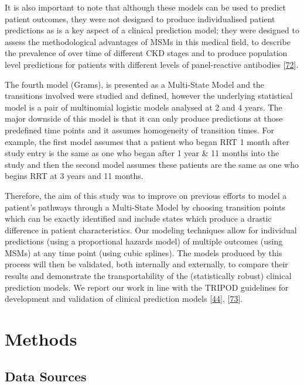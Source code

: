 \documentclass[12pt,PhD,twoside,openright]{muthesis}
\begin{document}
It is also important to note that although these models can be used to predict patient outcomes, they were not designed to produce individualised patient predictions as is a key aspect of a clinical prediction model; they were designed to assess the methodological advantages of MSMs in this medical field, to describe the prevalence of over time of different CKD stages and to produce population level predictions for patients with different levels of panel-reactive antibodies {[}\protect\hyperlink{ref-royston_prognosis_2009}{72}{]}.

The fourth model (Grams), is presented as a Multi-State Model and the transitions involved were studied and defined, however the underlying statistical model is a pair of multinomial logistic models analysed at 2 and 4 years. The major downside of this model is that it can only produce predictions at those predefined time points and it assumes homogeneity of transition times. For example, the first model assumes that a patient who began RRT 1 month after study entry is the same as one who began after 1 year \& 11 months into the study and then the second model assumes these patients are the same as one who begins RRT at 3 years and 11 months.

Therefore, the aim of this study was to improve on previous efforts to model a patient's pathways through a Multi-State Model by choosing transition points which can be exactly identified and include states which produce a drastic difference in patient characteristics. Our modeling techniques allow for individual predictions (using a proportional hazards model) of multiple outcomes (using MSMs) at any time point (using cubic splines). The models produced by this process will then be validated, both internally and externally, to compare their results and demonstrate the transportability of the (statistically robust) clinical prediction models. We report our work in line with the TRIPOD guidelines for development and validation of clinical prediction models {[}\protect\hyperlink{ref-collins_transparent_2015}{44}{]}, {[}\protect\hyperlink{ref-moons_transparent_2015}{73}{]}.

\hypertarget{methods-7}{%
\section{Methods}\label{methods-7}}

\hypertarget{data-sources}{%
\subsection{Data Sources}\label{data-sources}}
\end{document}

